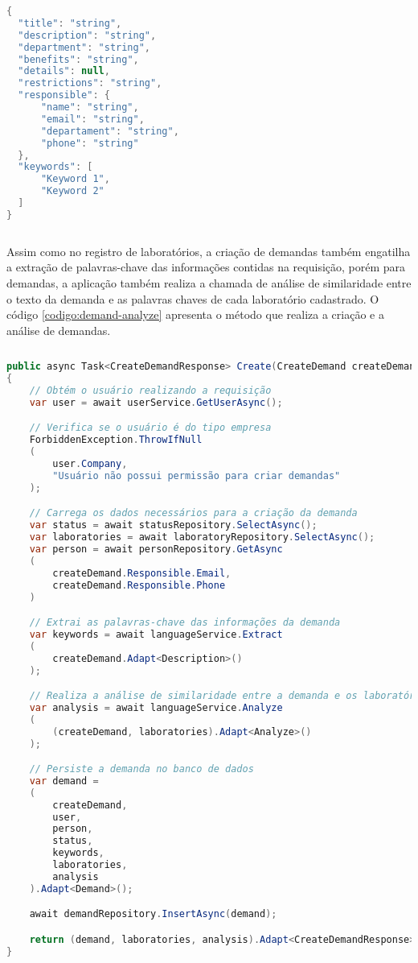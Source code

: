 \begin{sourcecode}[htb]
  \caption{\label{codigo:create-demand}Corpo JSON de registro de demandas}
  \begin{lstlisting}[frame=single, language=Java]
{
  "title": "string",
  "description": "string",
  "department": "string",
  "benefits": "string",
  "details": null,
  "restrictions": "string",
  "responsible": {
      "name": "string",
      "email": "string",
      "departament": "string",
      "phone": "string"
  },
  "keywords": [
      "Keyword 1",
      "Keyword 2"
  ]
}
\end{lstlisting}
  \fonte{}
\end{sourcecode}

Assim como no registro de laboratórios, a criação de demandas também engatilha a extração de palavras-chave das informações contidas na requisição, porém para demandas, a aplicação também realiza a chamada de análise de similaridade entre o texto da demanda e as palavras chaves de cada laboratório cadastrado. O código \ref{codigo:demand-analyze} apresenta o método que realiza a criação e a análise de demandas.

\begin{sourcecode}[htb]
  \caption{\label{codigo:demand-analyze}Método de cadastro e análise de demandas}
  \begin{lstlisting}[frame=single, language=Java]
public async Task<CreateDemandResponse> Create(CreateDemand createDemand)
{
    // Obtém o usuário realizando a requisição
    var user = await userService.GetUserAsync();

    // Verifica se o usuário é do tipo empresa
    ForbiddenException.ThrowIfNull
    (
        user.Company, 
        "Usuário não possui permissão para criar demandas"
    );

    // Carrega os dados necessários para a criação da demanda
    var status = await statusRepository.SelectAsync();
    var laboratories = await laboratoryRepository.SelectAsync();
    var person = await personRepository.GetAsync
    (
        createDemand.Responsible.Email, 
        createDemand.Responsible.Phone
    )

    // Extrai as palavras-chave das informações da demanda
    var keywords = await languageService.Extract
    (
        createDemand.Adapt<Description>()
    );

    // Realiza a análise de similaridade entre a demanda e os laboratórios
    var analysis = await languageService.Analyze
    (
        (createDemand, laboratories).Adapt<Analyze>()
    );

    // Persiste a demanda no banco de dados
    var demand = 
    (
        createDemand, 
        user, 
        person, 
        status, 
        keywords, 
        laboratories, 
        analysis
    ).Adapt<Demand>();

    await demandRepository.InsertAsync(demand);

    return (demand, laboratories, analysis).Adapt<CreateDemandResponse>();
}
\end{lstlisting}
  \fonte{}
\end{sourcecode}

